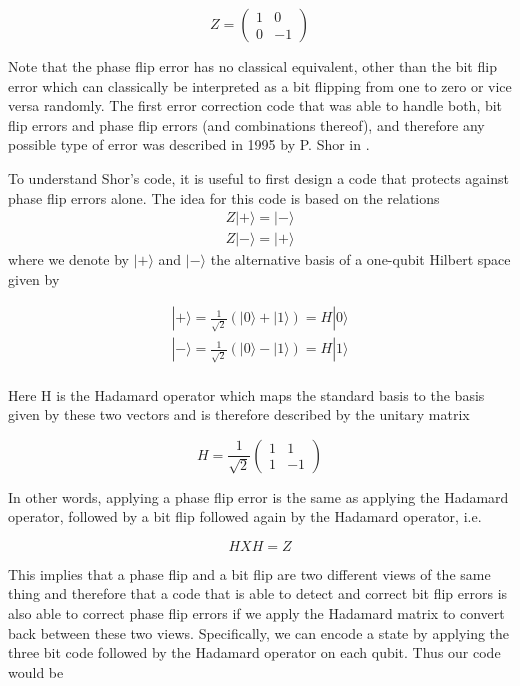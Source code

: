 \documentclass[a4paper, draft]{article}
\theoremstyle{own}
\theoremstyle{remark}
\begin{document}
$$
Z = \begin{pmatrix} 1 & 0 \\ 0 & -1 \end{pmatrix}
$$

Note that the phase flip error has no classical equivalent, other than the bit flip error which can classically be interpreted as a bit flipping from one to zero or vice versa randomly. The first error correction code that was able to handle both, bit flip errors and phase flip errors (and combinations thereof), and therefore any possible type of error was described in 1995 by P. Shor in \cite{Shor}. 

To understand Shor's code, it is useful to first design a code that protects against phase flip errors alone. The idea for this code is based on the relations
\begin{align*}
Z|+\rangle = |- \rangle \\
Z|-\rangle  = |+ \rangle
\end{align*}
where we denote by $|+\rangle $ and $|- \rangle$ the alternative basis of a one-qubit Hilbert space given by 

\begin{align*}
|+\rangle = \frac{1}{\sqrt{2}} (|0 \rangle + |1 \rangle) = H |0\rangle \\
|-\rangle = \frac{1}{\sqrt{2}} (|0 \rangle - |1 \rangle) = H |1\rangle \\
\end{align*}

Here H is the Hadamard operator which maps the standard basis to the basis given by these two vectors and is therefore described by the unitary matrix

$$
H = \frac{1}{\sqrt{2}} \begin{pmatrix}1 & 1 \\ 1 & -1 \end{pmatrix}
$$

In other words, applying a phase flip error is the same as applying the Hadamard operator, followed by a bit flip followed again by the Hadamard operator, i.e.

$$
H X H = Z
$$

This implies that a phase flip and a bit flip are two different views of the same thing and therefore that a code that is able to detect and correct bit flip errors is also able to correct phase flip errors if we apply the Hadamard matrix to convert back between these two views. Specifically, we can encode a state by applying the three bit code followed by the Hadamard operator on each qubit. Thus our code would be
\end{document}
